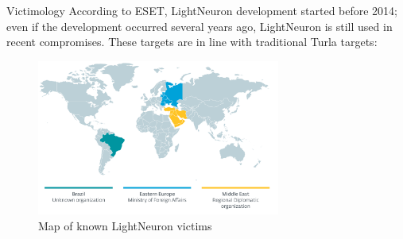 \begin{frame}[fragile]{Victimology}
  According to ESET, LightNeuron development started before 2014; even if the development occurred
several years ago, LightNeuron is still used in recent compromises. These targets are in line with traditional Turla targets:
\begin{figure}
  \includegraphics[width=8cm]{figures/map.PNG}
  \caption{Map of known LightNeuron victims}
\end{figure}
\end{frame}